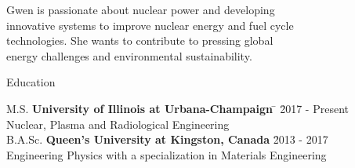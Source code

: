 \documentclass{resume2} %
\begin{document}
\centering
\iffalse
I am an engineer that is passionate about \\ 
nuclear technology and developing innovative \\
systems to face today's energy challenges.   
\fi
Gwen is passionate about nuclear power and developing \\
innovative systems to improve nuclear energy and fuel cycle\\
technologies. She wants to contribute to pressing global\\
energy challenges and environmental sustainability. 

\raggedright

\begin{rSection}{Education}
	
\begin{tabbing}
M.S. \hspace*{2 em}\= \textbf{University of Illinois at Urbana-Champaign} \hspace*{5em} \= \hspace*{6em} \= 2017 - Present \\
\> Nuclear, Plasma and Radiological Engineering \\
%
B.A.Sc. \hspace*{2 em}\> \textbf{Queen's University at Kingston, Canada} \> \hspace*{7.2em} \= 2013 - 2017 \\
\> Engineering Physics with a specialization in Materials Engineering
\end{tabbing}

\end{rSection}

\end{document}
